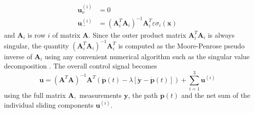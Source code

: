 \documentclass[twocolumn,10pt]{asme2e}
\begin{document}
{\begin{align}
	\textbf{u}_o^{(i)}&=0\\%
	\textbf{u}_{-}^{(i)}&=\left(\textbf{A}_i^T\textbf{A}_i\right)^{-1}\textbf{A}_i^T\varepsilon\sigma_i(\textbf{x}) \label{eq46}
\end{align}
and $\textbf{A}_i$ is row $i$ of matrix $\textbf{A}$. Since the outer product matrix $\textbf{A}_i^T\textbf{A}_i$ is always singular, the quantity $\left(\textbf{A}_i^T\textbf{A}_i\right)^{-1}\textbf{A}_i^T$ is computed as the Moore-Penrose pseudo inverse of $\textbf{A}_i$ using any convenient numerical algorithm such as the singular value decomposition \cite{strang2006linear}. The overall control signal becomes
\begin{equation}
	\textbf{u}=\left(\textbf{A}^T\textbf{A}\right)^{-1}\textbf{A}^T\left(\ddot{\textbf{p}}(t)-\lambda\left[\dot{\textbf{y}}-\dot{\textbf{p}}(t)\right]\right)+\sum_{i=1}^3\textbf{u}^{(i)}
\end{equation}using the full matrix $\textbf{A},$ measurements $\textbf{y}$, the path $\textbf{p}(t)$ and the net sum of the individual sliding components $\textbf{u}^{(i)}.$

}
\end{document}
